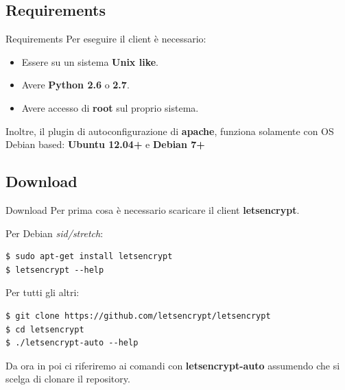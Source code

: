 \documentclass[xcolor=svgnames,11pt]{beamer}
\begin{document}
\subsection{Requirements}
\begin{frame}{Requirements}
Per eseguire il client è necessario:
\begin{itemize}
  \item Essere su un sistema \textbf{Unix like}.
  \item Avere \textbf{Python 2.6} o \textbf{2.7}.
  \item Avere accesso di \textbf{root} sul proprio sistema.
\end{itemize}

\medskip\pause

Inoltre, il plugin di autoconfigurazione di \textbf{apache}, funziona solamente con
OS Debian based: \textbf{Ubuntu 12.04+} e \textbf{Debian 7+}
\end{frame}

\subsection{Download}
\begin{frame}[fragile]{Download}
Per prima cosa è necessario scaricare il client \textbf{letsencrypt}.

\medskip\pause
Per Debian \emph{sid/stretch}:
\begin{block}{}
\begin{scriptsize}
\begin{verbatim}
$ sudo apt-get install letsencrypt
$ letsencrypt --help
\end{verbatim}
\end{scriptsize}
\end{block}

\medskip\pause
Per tutti gli altri:
\begin{block}{}
\begin{scriptsize}
\begin{verbatim}
$ git clone https://github.com/letsencrypt/letsencrypt
$ cd letsencrypt
$ ./letsencrypt-auto --help
\end{verbatim}
\end{scriptsize}
\end{block}

\medskip\pause

Da ora in poi ci riferiremo ai comandi con \textbf{letsencrypt-auto} assumendo che
si scelga di clonare il repository.

\end{frame}
\end{document}
